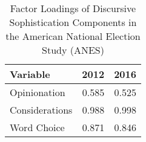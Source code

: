 \begin{table}[ht]
\centering
\begin{tabular}{lrr}
  \hline
Variable & 2012 & 2016 \\ 
  \hline
Opinionation & 0.585 & 0.525 \\ 
  Considerations & 0.988 & 0.998 \\ 
  Word Choice & 0.871 & 0.846 \\ 
   \hline
\end{tabular}
\caption{Factor Loadings of Discursive Sophistication Components
         in the American National Election Study (ANES)} 
\label{app:factload}
\end{table}
